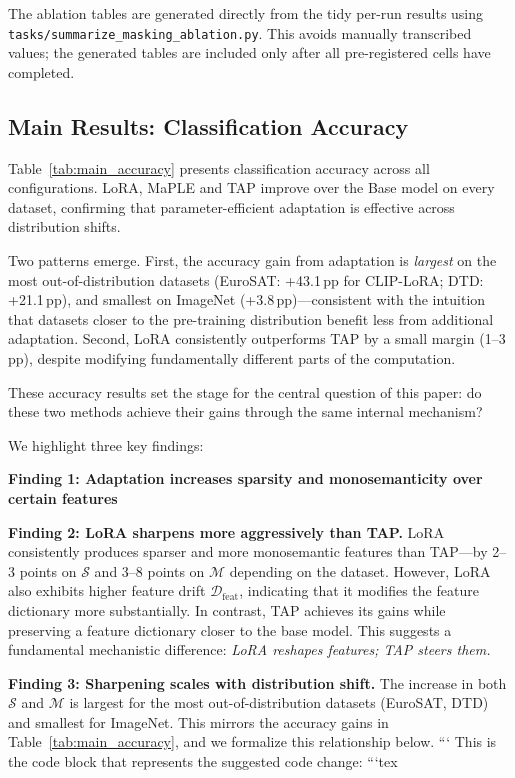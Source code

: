 The ablation tables are generated directly from the tidy per-run results using
\texttt{tasks/summarize\_masking\_ablation.py}. This avoids manually transcribed
values; the generated tables are included only after all pre-registered cells
have completed.


\subsection{Main Results: Classification Accuracy}
\label{sec:exp:accuracy}

Table~\ref{tab:main_accuracy} presents classification accuracy across all configurations.
LoRA, MaPLE and TAP improve over the Base model on every dataset, confirming that parameter-efficient adaptation is effective across distribution shifts.

Two patterns emerge.
First, the accuracy gain from adaptation is \emph{largest} on the most out-of-distribution datasets (EuroSAT: +43.1\,pp for CLIP-LoRA; DTD: +21.1\,pp), and smallest on ImageNet (+3.8\,pp)---consistent with the intuition that datasets closer to the pre-training distribution benefit less from additional adaptation.
Second, LoRA consistently outperforms TAP by a small margin (1--3\,pp), despite modifying fundamentally different parts of the computation.

These accuracy results set the stage for the central question of this paper: do these two methods achieve their gains through the same internal mechanism?



We highlight three key findings:

\textbf{Finding 1: Adaptation increases sparsity and monosemanticity over certain features}


\textbf{Finding 2: LoRA sharpens more aggressively than TAP.}
LoRA consistently produces sparser and more monosemantic features than TAP---by 2--3 points on $\mathcal{S}$ and 3--8 points on $\mathcal{M}$ depending on the dataset.
However, LoRA also exhibits higher feature drift $\mathcal{D}_\text{feat}$, indicating that it modifies the feature dictionary more substantially.
In contrast, TAP achieves its gains while preserving a feature dictionary closer to the base model.
This suggests a fundamental mechanistic difference: \emph{LoRA reshapes features; TAP steers them.}

\textbf{Finding 3: Sharpening scales with distribution shift.}
The increase in both $\mathcal{S}$ and $\mathcal{M}$ is largest for the most out-of-distribution datasets (EuroSAT, DTD) and smallest for ImageNet.
This mirrors the accuracy gains in Table~\ref{tab:main_accuracy}, and we formalize this relationship below.
```
This is the code block that represents the suggested code change:
```tex
